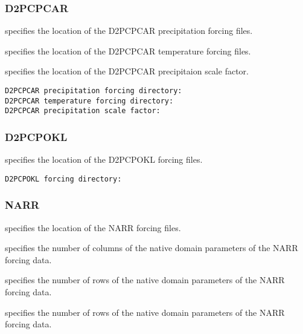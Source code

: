  
 
 \subsubsection{D2PCPCAR} \label{sssec:supp_d2pcpcar}
 

 
  specifies the
 location of the D2PCPCAR precipitation forcing files.

  specifies the
 location of the D2PCPCAR temperature forcing files.

  specifies the
 location of the D2PCPCAR precipitaion scale factor.
 

 \begin{Verbatim}[frame=single]
D2PCPCAR precipitation forcing directory:
D2PCPCAR temperature forcing directory:
D2PCPCAR precipitation scale factor:
 \end{Verbatim}
 

 
 
 \subsubsection{D2PCPOKL} \label{sssec:supp_d2pcpokl}
 

 
  specifies the location of the
 D2PCPOKL forcing files.
 

 \begin{Verbatim}[frame=single]
D2PCPOKL forcing directory:
 \end{Verbatim}
 

 
 \subsubsection{NARR} \label{sssec:supp_narr}
 

 
  specifies the location of the
 NARR forcing files.

  specifies the number of
 columns of the native domain parameters of the NARR forcing data.

  specifies the number of
 rows of the native domain parameters of the NARR forcing data.

  specifies the number of
 rows of the native domain parameters of the NARR forcing data.

